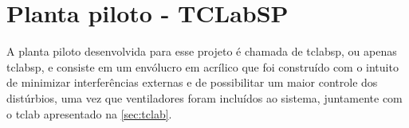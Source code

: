\section{Planta piloto - TCLabSP}
\label{sec:planta_piloto}

A planta piloto desenvolvida para esse projeto é chamada de \acrlong{tclabsp}, ou apenas \acrshort{tclabsp},
e consiste em um envólucro em acrílico que foi construído com o intuito de minimizar interferências
externas e de possibilitar um maior controle dos distúrbios, uma vez que ventiladores foram incluídos
ao sistema, juntamente com o \acrshort{tclab} apresentado na \cref{sec:tclab}.

